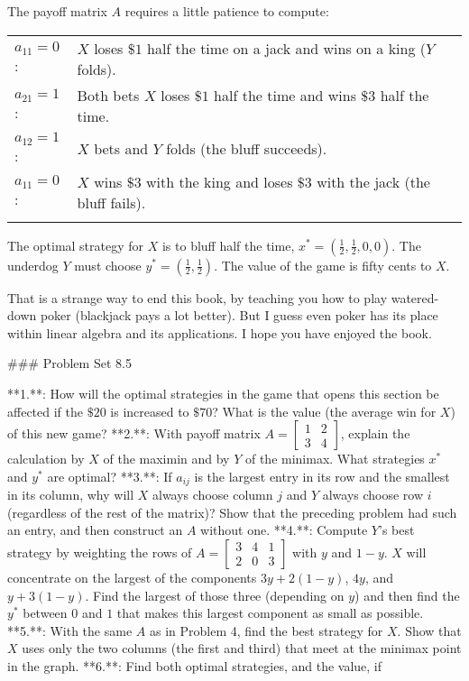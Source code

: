 The payoff matrix \(A\) requires a little patience to compute:

\begin{tabular}{l l l} \(a_{11}=0\): & \(X\) loses \(\$1\) half the time on a jack and wins on a king (\(Y\) folds). \\ \(a_{21}=1\): & Both bets \(X\) loses \(\$1\) half the time and wins \(\$3\) half the time. \\ \(a_{12}=1\): & \(X\) bets and \(Y\) folds (the bluff succeeds). \\ \(a_{11}=0\): & \(X\) wins \(\$3\) with the king and loses \(\$3\) with the jack (the bluff fails). \\  & \\ \end{tabular} The optimal strategy for \(X\) is to bluff half the time, \(x^{*}=(\frac{1}{2},\frac{1}{2},0,0)\). The underdog \(Y\) must choose \(y^{*}=(\frac{1}{2},\frac{1}{2})\). The value of the game is fifty cents to \(X\).

That is a strange way to end this book, by teaching you how to play watered-down poker (blackjack pays a lot better). But I guess even poker has its place within linear algebra and its applications. I hope you have enjoyed the book.

### Problem Set 8.5

**1.**: How will the optimal strategies in the game that opens this section be affected if the \(\$20\) is increased to \(\$70\)? What is the value (the average win for \(X\)) of this new game?
**2.**: With payoff matrix \(A=\left[\begin{smallmatrix}1&2\\ 3&4\end{smallmatrix}\right]\), explain the calculation by \(X\) of the maximin and by \(Y\) of the minimax. What strategies \(x^{*}\) and \(y^{*}\) are optimal?
**3.**: If \(a_{ij}\) is the largest entry in its row and the smallest in its column, why will \(X\) always choose column \(j\) and \(Y\) always choose row \(i\) (regardless of the rest of the matrix)? Show that the preceding problem had such an entry, and then construct an \(A\) without one.
**4.**: Compute \(Y\)'s best strategy by weighting the rows of \(A=\left[\begin{smallmatrix}3&4&1\\ 2&0&3\end{smallmatrix}\right]\) with \(y\) and \(1-y\). \(X\) will concentrate on the largest of the components \(3y+2(1-y)\), \(4y\), and \(y+3(1-y)\). Find the largest of those three (depending on \(y\)) and then find the \(y^{*}\) between \(0\) and \(1\) that makes this largest component as small as possible.
**5.**: With the same \(A\) as in Problem 4, find the best strategy for \(X\). Show that \(X\) uses only the two columns (the first and third) that meet at the minimax point in the graph.
**6.**: Find both optimal strategies, and the value, if

